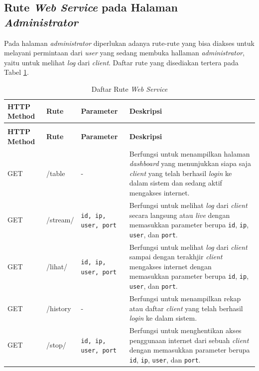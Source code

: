 \subsection{Rute \textit{Web Service} pada Halaman \textit{Administrator}}
Pada halaman \textit{administrator} diperlukan adanya rute-rute yang bisa diakses untuk melayani permintaan dari \textit{user} yang sedang membuka hallaman \textit{administrator}, yaitu untuk melihat \textit{log} dari \textit{client}. Daftar rute yang disediakan tertera pada Tabel \ref{rutehalamanadmin}.\\
\begin{longtable}{|p{}|p{}|p{}|p{}|} %
	
	\caption{Daftar Rute \textit{Web Service} pada Halaman \textit{Administrator}} \label{rutehalamanadmin} \\
	\hline
	\textbf{HTTP Method} & \textbf{Rute} & \textbf{Parameter} & \textbf{Deskripsi} \\ \hline
	
	\endfirsthead
	\caption[]{Daftar Rute \textit{Web Service}}  \\
	\hline
	\textbf{HTTP Method} & \textbf{Rute} & \textbf{Parameter} & \textbf{Deskripsi}  \\ \hline
	
	\endhead
	\endfoot
	\endlastfoot
	
	GET & /table & - & Berfungsi untuk menampilkan halaman \textit{dashboard} yang menunjukkan siapa saja \textit{client} yang telah berhasil \textit{login} ke dalam sistem dan sedang aktif mengakses internet.\\ \hline
	GET & /stream/ & \texttt{id, ip, user, port} & Berfungsi untuk melihat \textit{log} dari \textit{client} secara langsung atau \textit{live} dengan memasukkan parameter berupa \texttt{id}, \texttt{ip}, \texttt{user}, dan \texttt{port}.\\ \hline
	GET & /lihat/ & \texttt{id, ip, user, port} & Berfungsi untuk melihat \textit{log} dari \textit{client} sampai dengan terakhjir \textit{client} mengakses internet dengan memasukkan parameter berupa \texttt{id}, \texttt{ip}, \texttt{user}, dan \texttt{port}.\\ \hline
	GET & /history & - & Berfungsi untuk menampilkan rekap atau daftar \textit{client} yang telah berhasil \textit{login} ke dalam sistem.\\ \hline
	GET & /stop/ & \texttt{id, ip, user, port} & Berfungsi untuk menghentikan akses penggunaan internet dari sebuah \textit{client} dengan memasukkan parameter berupa \texttt{id}, \texttt{ip}, \texttt{user}, dan \texttt{port}.\\ \hline
\end{longtable}

